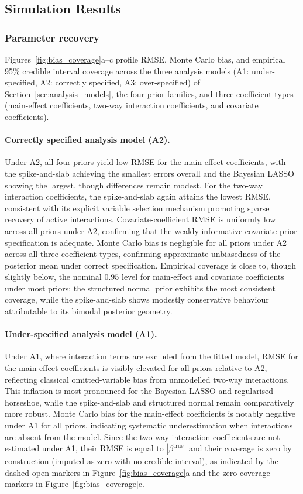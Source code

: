 \documentclass[12pt]{article}
\begin{document}
\subsection{Simulation Results}

\subsubsection{Parameter recovery}
Figures~\ref{fig:bias_coverage}a--c profile RMSE, Monte Carlo bias, and empirical 95\% credible interval coverage across the three analysis models (A1: 
under-specified, A2: correctly specified, A3: over-specified) of Section~\ref{sec:analysis_models}, the four prior families, and three coefficient types (main-effect coefficients, two-way interaction coefficients, and covariate coefficients).

\paragraph{Correctly specified analysis model (A2).}
Under A2, all four priors yield low RMSE for the main-effect coefficients, with the spike-and-slab achieving the smallest errors overall and the Bayesian LASSO 
showing the largest, though differences remain modest. For the two-way interaction coefficients, the spike-and-slab again attains the lowest RMSE, consistent with 
its explicit variable selection mechanism promoting sparse recovery of active interactions. Covariate-coefficient RMSE is uniformly low across all priors under A2, confirming that the weakly informative covariate prior specification is adequate. Monte Carlo bias is negligible for all priors under A2 across all three coefficient types, confirming approximate unbiasedness of the posterior mean under correct specification. Empirical coverage is close to, though slightly below, the nominal $0.95$ level for main-effect and covariate coefficients under most priors; the structured 
normal prior exhibits the most consistent coverage, while the spike-and-slab shows modestly conservative behaviour attributable to its bimodal posterior 
geometry.

\paragraph{Under-specified analysis model (A1).}
Under A1, where interaction terms are excluded from the fitted model, RMSE for the main-effect coefficients is visibly elevated for all priors relative to A2, reflecting classical 
omitted-variable bias from unmodelled two-way interactions. This inflation is most pronounced for the Bayesian LASSO and regularised horseshoe, while the spike-and-slab and structured normal remain comparatively more robust. Monte Carlo bias for the main-effect coefficients is notably negative under A1 for all priors, 
indicating systematic underestimation when interactions are absent from the model. Since the two-way interaction coefficients are not estimated under A1, their RMSE is equal to $|\beta^{\mathrm{true}}|$ and their coverage is zero by construction (imputed as zero with no credible interval), as indicated by the dashed open markers in Figure~\ref{fig:bias_coverage}a and the zero-coverage 
markers in Figure~\ref{fig:bias_coverage}c.
\end{document}
